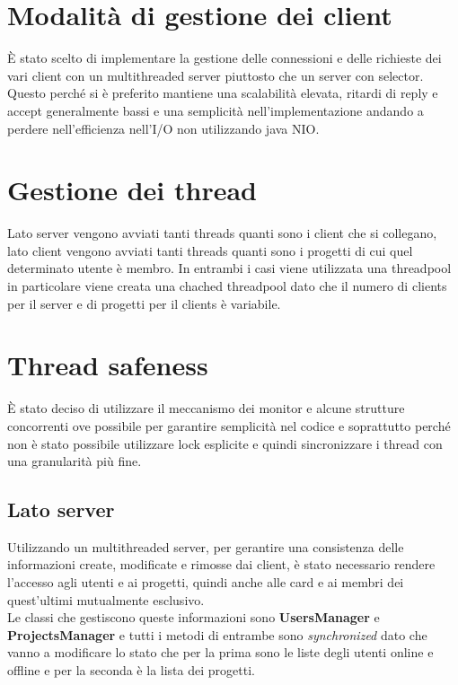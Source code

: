 \documentclass[11pt]{report}
\begin{document}
	\section{Modalità di gestione dei client}
	È stato scelto di implementare la gestione delle connessioni e delle richieste dei vari client con un multithreaded server piuttosto che un server con selector.
	Questo perché si è preferito mantiene una scalabilità elevata, ritardi di reply e accept generalmente bassi e una semplicità nell'implementazione andando a perdere nell'efficienza nell'I/O non utilizzando java NIO.
	
	\section{Gestione dei thread}
	Lato server vengono avviati tanti threads quanti sono i client che si collegano, lato client vengono avviati tanti threads quanti sono i progetti di cui quel determinato utente è membro.
	In entrambi i casi viene utilizzata una threadpool in particolare viene creata una chached threadpool dato che il numero di clients per il server e di progetti per il clients è variabile.
	
	\section{Thread safeness}
	È stato deciso di utilizzare il meccanismo dei monitor e alcune strutture concorrenti ove possibile per garantire semplicità nel codice e soprattutto perché non è stato possibile utilizzare lock esplicite e quindi sincronizzare i thread con una granularità più fine.
	
	\subsection{Lato server}
	Utilizzando un multithreaded server, per gerantire una consistenza delle informazioni create, modificate e rimosse dai client, è stato necessario rendere l'accesso agli utenti e ai progetti, quindi anche alle card e ai membri dei quest'ultimi mutualmente esclusivo.\\
	Le classi che gestiscono queste informazioni sono \textbf{UsersManager} e \textbf{ProjectsManager} e tutti i metodi di entrambe sono \textit{synchronized} dato che vanno a modificare lo stato che per la prima sono le liste degli utenti online e offline e per la seconda è la lista dei progetti. 
	
\end{document}
